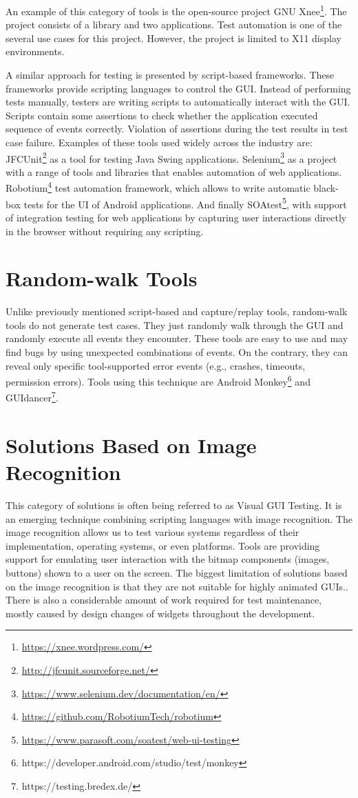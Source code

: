 An example of this category of tools is the open-source project GNU Xnee\footnote{\url{https://xnee.wordpress.com/}}. The project consists of a library and two applications. Test automation is one of the several use cases for this project. However, the project is limited to X11 display environments.\cite{xnee}

A similar approach for testing is presented by script-based frameworks. These frameworks provide scripting languages to control the GUI. Instead of performing tests manually, testers are writing scripts to automatically interact with the GUI. Scripts contain some assertions to check whether the application executed sequence of events correctly. Violation of assertions during the test results in test case failure. Examples of these tools used widely across the industry are: JFCUnit\footnote{\url{http://jfcunit.sourceforge.net/}} as a tool for testing Java Swing applications. Selenium\footnote{\url{https://www.selenium.dev/documentation/en/}} as a project with a range of tools and libraries that enables automation of web applications. Robotium\footnote{\url{https://github.com/RobotiumTech/robotium}} test automation framework, which allows to write automatic black-box tests for the UI of Android applications. And finally SOAtest\footnote{\url{https://www.parasoft.com/soatest/web-ui-testing}}, with support of integration testing for web applications by capturing user interactions directly in the browser without requiring any scripting.\cite{NguyenBao2014Gait}

\section{Random-walk Tools}
Unlike previously mentioned script-based and capture/replay tools, random-walk tools do not generate test cases. They just randomly walk through the GUI and randomly execute all events they encounter. These tools are easy to use and may find bugs by using unexpected combinations of events. On the contrary, they can reveal only specific tool-supported error events (e.g., crashes, timeouts, permission errors). Tools using this technique are Android Monkey\footnote{https://developer.android.com/studio/test/monkey} and GUIdancer\footnote{https://testing.bredex.de/}.

\section{Solutions Based on Image Recognition}
This category of solutions is often being referred to as Visual GUI Testing. It is an emerging technique combining scripting languages with image recognition. The image recognition allows us to test various systems regardless of their implementation, operating systems, or even platforms. Tools are providing support for emulating user interaction with the bitmap components (images, buttons) shown to a user on the screen. The biggest limitation of solutions based on the image recognition is that they are not suitable for highly animated GUIs.\cite{guitesting}. There is also a considerable amount of work required for test maintenance, mostly caused by design changes of widgets throughout the development.   

